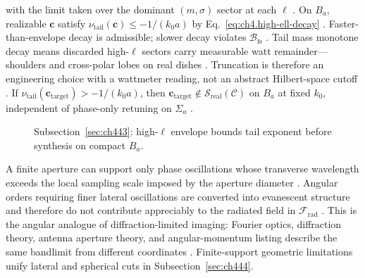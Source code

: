 with the limit taken over the dominant \((m,\sigma)\) sector at each \(\ell\) \cite{hansen1988}. On \(B_{a}\),
realizable \(\mathbf{c}\) satisfy \(\nu_{\mathrm{tail}}(\mathbf{c})\le-1/(k_{0}a)\) by Eq.~\eqref{eq:ch4.high-ell-decay}
\cite{jackson1999}. Faster-than-envelope decay is admissible; slower decay violates
\(\mathcal{B}_{\mathrm{fs}}\) \cite{hansen1988}.
Tail mass monotone decay means discarded high-$\ell$ sectors carry measurable watt remainder---shoulders and cross-polar lobes on real dishes \cite{harrington2001}. Truncation is therefore an engineering choice with a wattmeter reading, not an abstract Hilbert-space cutoff \cite{hansen1988}.
\label{cor:ch4.tail-exponent-obstruction}
If \(\nu_{\mathrm{tail}}(\mathbf{c}_{\mathrm{target}})>-1/(k_{0}a)\), then
\(\mathbf{c}_{\mathrm{target}}\notin\mathcal{S}_{\mathrm{real}}(\mathcal{C})\) on \(B_{a}\) at fixed \(k_{0}\), independent
of phase-only retuning on \(\Sigma_{a}\) \cite{stratton1941}.
\begin{figure}[t]
\centering
{}
\caption{Subsection~\ref{sec:ch443}: high-\(\ell\) envelope bounds tail exponent before synthesis on compact \(B_{a}\).}
\label{fig:ch4.tail-exponent-envelope}
\end{figure}
A finite aperture can support only phase oscillations whose transverse wavelength exceeds the local sampling
scale imposed by the aperture diameter \cite{stratton1941}.
Angular orders requiring finer lateral oscillations are converted into evanescent structure and therefore do not
contribute appreciably to the radiated field in $\mathcal{F}_{\mathrm{rad}}$ \cite{devaney2004}.
This is the angular analogue of diffraction-limited imaging: Fourier optics, diffraction theory, antenna aperture
theory, and angular-momentum listing describe the same bandlimit from different coordinates
\cite{stratton1941}.
Finite-support geometric limitations unify lateral and spherical cuts in Subsection~\ref{sec:ch444}.
